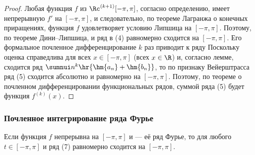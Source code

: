 \documentclass[a4paper]{article}
\begin{document}
\begin{proof}
Любая функция $f$ из $\Rc^{(k+1)}[-\pi,\pi]$, согласно определению,
имеет непрерывную $f'$ на $[-\pi,\pi]$, и следовательно, по теореме
Лагранжа о конечных приращениях, функция $f$ удовлетворяет условию
Липшица на $[-\pi,\pi]$. Поэтому, по теореме Дини--Липшица,
 и ряд в (4) равномерно сходится на $[-\pi,\pi]$.
Его формальное почленное дифференцирование $k$ раз приводит к ряду
 Поскольку оценка  справедлива для всех
$x\in[-\pi,\pi]$ (всех $x\in\R$) и, согласно лемме, сходится ряд
$\sumnui n^k \hr{\hm{a_n}+\hm{b_n}}$, то по признаку Вейерштрасса
ряд (5) сходится абсолютно и равномерно на $[-\pi,\pi]$. Поэтому, по
теореме о почленном дифференцировании функциональных рядов, суммой
ряда (5) будет функция $f^{(k)}(x)$.
\end{proof}

\subsubsection{Почленное интегрирование ряда Фурье}

\begin{theorem}
Если функция $f$ непрерывна на $[-\pi,\pi]$ и  --- её ряд Фурье, то
 для любого
$t\in[-\pi,\pi]$ и ряд (7) равномерно сходится на $[-\pi,\pi]$.
\end{theorem}
\end{document}
